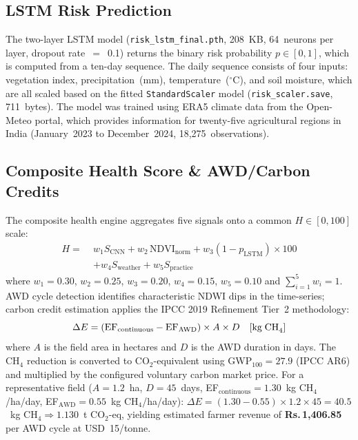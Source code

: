 \documentclass[conference]{IEEEtran}
\begin{document}
\subsection{LSTM Risk Prediction}

The two-layer LSTM model (\texttt{risk\_lstm\_final.pth}, 208~KB, 64~neurons per layer, dropout rate~$=$~0.1) returns the binary risk probability $p \in [0,1]$, which is computed from a ten-day sequence. The daily sequence consists of four inputs: vegetation index, precipitation~(mm), temperature~($^\circ$C), and soil moisture, which are all scaled based on the fitted \texttt{StandardScaler} model (\texttt{risk\_scaler.save}, 711~bytes). The model was trained using ERA5 climate data from the Open-Meteo portal, which provides information for twenty-five agricultural regions in India (January~2023 to December~2024, 18,275~observations).

\subsection{Composite Health Score \& AWD/Carbon Credits}

The composite health engine aggregates five signals onto a common $H \in [0,100]$ scale:
\begin{equation}
\begin{split}
H = \; & w_1 S_{\text{CNN}} + w_2\,\mathrm{NDVI}_{\text{norm}} + w_3(1-p_{\text{LSTM}})\times100 \\
       & + w_4 S_{\text{weather}} + w_5 S_{\text{practice}}
\end{split}
\label{eq:health}
\end{equation}
where $w_1{=}0.30$, $w_2{=}0.25$, $w_3{=}0.20$, $w_4{=}0.15$, $w_5{=}0.10$ and $\sum_{i=1}^{5} w_i=1$. AWD cycle detection identifies characteristic NDWI dips in the time-series; carbon credit estimation applies the IPCC 2019 Refinement Tier~2 methodology:
\begin{equation}
\Delta E = (\mathrm{EF}_{\text{continuous}} - \mathrm{EF}_{\text{AWD}}) \times A \times D \quad [\text{kg\;CH}_4]
\label{eq:carbon}
\end{equation}
where $A$ is the field area in hectares and $D$ is the AWD duration in days. The CH$_4$ reduction is converted to CO$_2$-equivalent using GWP$_{100}=27.9$ (IPCC AR6) and multiplied by the configured voluntary carbon market price. For a representative field ($A=1.2$~ha, $D=45$~days, EF$_{\text{continuous}}=1.30$~kg CH$_4$/ha/day, EF$_{\text{AWD}}=0.55$~kg CH$_4$/ha/day): $\Delta E = (1.30-0.55)\times1.2\times45 = 40.5$~kg CH$_4 \Rightarrow 1.130$~t CO$_2$-eq, yielding estimated farmer revenue of \textbf{Rs.\,1{,}406.85} per AWD cycle at USD~15/tonne.
\end{document}

